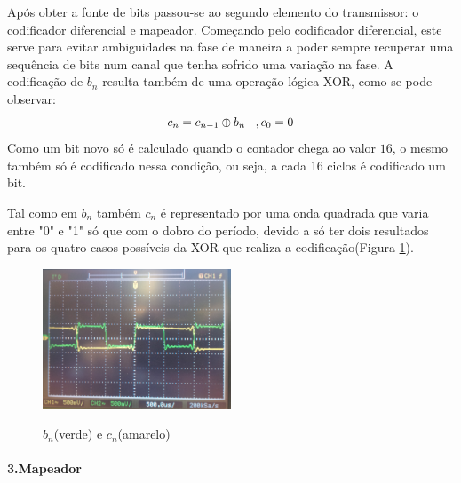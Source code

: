\documentclass[11pt]{article}
\numberwithin{equation}{section}
\begin{document}
Após obter a fonte de bits passou-se ao segundo elemento do transmissor: o codificador diferencial e mapeador. Começando pelo codificador diferencial, este serve para evitar ambiguidades na fase de maneira a poder sempre recuperar uma sequência de bits num canal que tenha sofrido uma variação na fase.
A codificação de $b_n$ resulta também de uma operação lógica XOR, como se pode observar: 
\begin{equation}
c_n=c_{n-1} \oplus b_n \hspace{3 mm} ,c_0=0
\end{equation}
Como um bit novo só é calculado quando o contador chega ao valor $16$, o mesmo também só é codificado nessa condição, ou seja, a cada 16 ciclos é codificado um bit. 

Tal como em $ b_n $ também $ c_n $ é representado por uma onda quadrada que varia entre "0" e "1" só que com o dobro do período, devido a só ter dois resultados para os quatro casos possíveis da XOR que realiza a codificação(Figura \ref{bn_cn}).
\begin{figure}[H]
	\centering
	\includegraphics[width=0.5\textwidth]{./bn_cn}~\\
	\caption{$ b_n $(verde) e $ c_n $(amarelo)}
	\label{bn_cn}
\end{figure}

\paragraph{3.Mapeador} \hspace{0pt}
\end{document}
